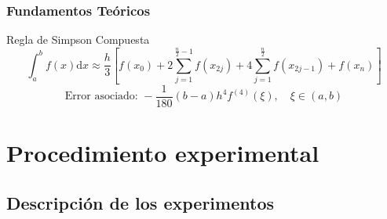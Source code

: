 \documentclass{beamer}
\begin{document}
\begin{frame}

  \frametitle{Fundamentos Teóricos}
  
  \begin{block}{Regla de Simpson Compuesta}
    \[ \int_{a}^{b}f(x) \text{d}x \approx \frac{h}{3}\left[f(x_0) + 2\sum_{j=1}^{\frac{n}{2}-1} f(x_{2j}) + 
    4\sum_{j=1}^{\frac{n}{2}} f(x_{2j-1}) + f(x_n)\right] \]
    \[\text{Error asociado: }-\frac{1}{180}(b-a)h^4f^{(4)}(\xi), \quad \xi \in (a,b) \]
  \end{block}

\end{frame}

\section{Procedimiento experimental}


\subsection{Descripción de los experimentos}
\end{document}
